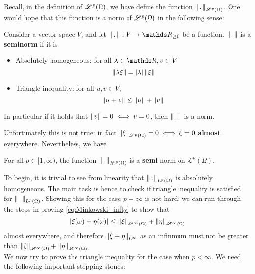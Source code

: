 Recall, in the definition of $\mathcal{L}^p(\Omega)$, we have define the function $\left\| \,.\, \right\|_{\mathcal{L}^p(\Omega)}$. One would hope that this function is a norm of $\mathcal{L}^p(\Omega)$ in the following sense:

\begin{definition} Consider a vector space $V$, and let $\norm{\,.\,}:V \to \R_{\geq 0}$ be a function. $\left\| \,.\, \right\|$ is a \textbf{seminorm} if it is
\begin{itemize}
    \item Absolutely homogeneous: for all $\lambda \in \R, v \in V$
    \begin{equation}
        \left\| \lambda \xi \right\| = |\lambda| \left\| \xi \right\|
    \end{equation}
    \item Triangle inequality: for all $u,v \in V$,
    \begin{equation}
        \left\| u + v \right\| \leq \left\| u \right\| + \left\| v \right\|
    \end{equation}
\end{itemize}
In particular if it holds that $\left\| v \right\| = 0 \iff v = 0$, then $\left\| \,.\, \right\|$ is a norm.
\end{definition}

Unfortunately this is not true: in fact $\left\| \xi \right\|_{\mathcal{L}^p(\Omega)} = 0 \iff \xi = 0$ \textbf{almost} everywhere. Nevertheless, we have
\begin{theorem}
For all $p \in [1,\infty)$, the function $\left\| \,.\, \right\|_{\mathcal{L}^p(\Omega)}$ is a \textbf{semi}-norm on $\mathcal{L}^p(\Omega)$.
\end{theorem}

To begin, it is trivial to see from linearity that $\left\| \,.\, \right\|_{L^p(\Omega)}$ is absolutely homogeneous. The main task is hence to check if triangle inequality is satisfied for $\left\| \,.\, \right\|_{L^p(\Omega)}$. Showing this for the case $p = \infty$ is not hard: we can run through the steps in proving \eqref{eq:Minkowski_infty} to show that 
\begin{equation*}
    |\xi(\omega) + \eta(\omega)| \leq \left\| \xi \right\|_{\mathcal{L}^\infty(\Omega)} + \left\| \eta \right\|_{\mathcal{L}^\infty(\Omega)}
\end{equation*}
almost everywhere, and therefore $\left\| \xi + \eta \right\|_{L^\infty}$ as an infinmum must not be greater than $\left\| \xi \right\|_{\mathcal{L}^\infty(\Omega)} + \left\| \eta \right\|_{\mathcal{L}^\infty(\Omega)}$.\\

We now try to prove the triangle inequality for the case when $p<\infty$. We need the following important stepping stones:

